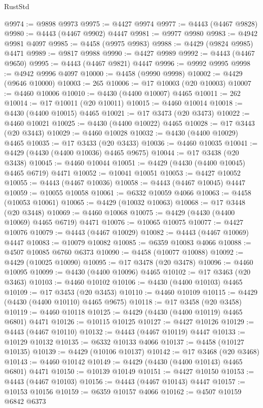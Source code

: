 \begin{lexlean}{RustStd}
\begin{coremodule}
@9974 := @9898 @9973
@9975 := @4427 @9974
@9977 := @4443 (@4467 @9828)
@9980 := @4443 (@4467 @9902) @4447
@9981 := @9977 @9980
@9983 := @4942 @9981 @4097
@9985 := @4458 (@9975 @9983)
@9988 := @4429 (@9824 @9985) @4471
@9989 := @9817 @9988
@9990 := @4427 @9989
@9992 := @4443 (@4467 @9650)
@9995 := @4443 (@4467 @9821) @4447
@9996 := @9992 @9995
@9998 := @4942 @9996 @4097
@10000 := @4458 (@9990 @9998)
@10002 := @4429 (@9646 @10000)
@10003 := 265
@10006 := @17 @10003 (@20 @10003)
@10007 := @4460 @10006
@10010 := @4430 (@4400 @10007) @4465
@10011 := 262
@10014 := @17 @10011 (@20 @10011)
@10015 := @4460 @10014
@10018 := @4430 (@4400 @10015) @4465
@10021 := @17 @3473 (@20 @3473)
@10022 := @4460 @10021
@10025 := @4430 (@4400 @10022) @4465
@10028 := @17 @3443 (@20 @3443)
@10029 := @4460 @10028
@10032 := @4430 (@4400 @10029) @4465
@10035 := @17 @3433 (@20 @3433)
@10036 := @4460 @10035
@10041 := @4429 (@4430 (@4400 @10036) @4465 @9675)
@10044 := @17 @3438 (@20 @3438)
@10045 := @4460 @10044
@10051 := @4429 (@4430 (@4400 @10045) @4465 @6719) @4471
@10052 := @10041 @10051
@10053 := @4427 @10052
@10055 := @4443 (@4467 @10036)
@10058 := @4443 (@4467 @10045) @4447
@10059 := @10055 @10058
@10061 := @6332 @10059 @4066
@10063 := @4458 (@10053 @10061)
@10065 := @4429 (@10032 @10063)
@10068 := @17 @3448 (@20 @3448)
@10069 := @4460 @10068
@10075 := @4429 (@4430 (@4400 @10069) @4465 @6719) @4471
@10076 := @10065 @10075
@10077 := @4427 @10076
@10079 := @4443 (@4467 @10029)
@10082 := @4443 (@4467 @10069) @4447
@10083 := @10079 @10082
@10085 := @6359 @10083 @4066
@10088 := @4507 @10085 @6760 @6373
@10090 := @4458 (@10077 @10088)
@10092 := @4429 (@10025 @10090)
@10095 := @17 @3478 (@20 @3478)
@10096 := @4460 @10095
@10099 := @4430 (@4400 @10096) @4465
@10102 := @17 @3463 (@20 @3463)
@10103 := @4460 @10102
@10106 := @4430 (@4400 @10103) @4465
@10109 := @17 @3453 (@20 @3453)
@10110 := @4460 @10109
@10115 := @4429 (@4430 (@4400 @10110) @4465 @9675)
@10118 := @17 @3458 (@20 @3458)
@10119 := @4460 @10118
@10125 := @4429 (@4430 (@4400 @10119) @4465 @6801) @4471
@10126 := @10115 @10125
@10127 := @4427 @10126
@10129 := @4443 (@4467 @10110)
@10132 := @4443 (@4467 @10119) @4447
@10133 := @10129 @10132
@10135 := @6332 @10133 @4066
@10137 := @4458 (@10127 @10135)
@10139 := @4429 (@10106 @10137)
@10142 := @17 @3468 (@20 @3468)
@10143 := @4460 @10142
@10149 := @4429 (@4430 (@4400 @10143) @4465 @6801) @4471
@10150 := @10139 @10149
@10151 := @4427 @10150
@10153 := @4443 (@4467 @10103)
@10156 := @4443 (@4467 @10143) @4447
@10157 := @10153 @10156
@10159 := @6359 @10157 @4066
@10162 := @4507 @10159 @6842 @6373

\end{coremodule}
\end{lexlean}
